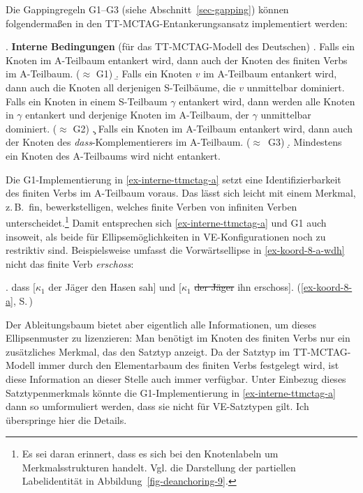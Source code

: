 Die Gappingregeln G1--G3 (siehe Abschnitt~\ref{sec-gapping}) können folgenderma\ss en in den TT-MC\-TAG-Entankerungsansatz implementiert werden: 

\ex. {\bf Interne Bedingungen} (für das TT-MCTAG-Modell des Deutschen) \label{ex-interne-ttmctag}
\a. Falls ein Knoten im A-Teilbaum entankert wird, dann auch der Knoten des finiten Verbs im A-Teilbaum. ($\approx$ G1)\label{ex-interne-ttmctag-a}
\b. Falls ein Knoten $v$ im A-Teilbaum entankert wird, dann auch die Knoten all derjenigen S-Teilbäume, die $v$ unmittelbar dominiert. Falls ein Knoten in einem S-Teilbaum $\gamma$ entankert wird, dann werden alle Knoten in $\gamma$ entankert und derjenige Knoten im A-Teilbaum, der $\gamma$ unmittelbar dominiert. ($\approx$ G2)\label{ex-interne-ttmctag-b}
\c. Falls ein Knoten im A-Teilbaum entankert wird, dann auch der Knoten des \emph{dass}-Komplementierers im A-Teilbaum. ($\approx$~G3)\label{ex-interne-ttmctag-c}
\d. Mindestens ein Knoten des A-Teilbaums wird nicht entankert.\label{ex-interne-ttmctag-d} %

Die G1-Implementierung in \ref{ex-interne-ttmctag-a} setzt eine Identifizierbarkeit des finiten Verbs im A-Teil\-baum voraus. Das lässt sich leicht mit einem Merkmal, z.\,B.\ {\sc fin}, bewerkstelligen, welches finite Verben von infiniten Verben unterscheidet.\footnote{Es sei daran erinnert, dass es sich bei den Knotenlabeln um Merkmalsstrukturen handelt. Vgl. die Darstellung der partiellen Labelidentität in Abbildung~\ref{fig-deanchoring-9}.} Damit entsprechen sich \ref{ex-interne-ttmctag-a} und G1 auch insoweit, als beide für Ellipsemöglichkeiten in VE-Konfigurationen noch zu restriktiv sind. Beispielsweise umfasst die Vorwärtsellipse in \ref{ex-koord-8-a-wdh} nicht das finite Verb {\it erschoss}: 

\ex. \label{ex-koord-8-a-wdh}dass [$\kappa_1$ der Jäger den Hasen sah] und [$\kappa_1$ \sout{der Jäger} ihn erschoss]. \hfill (\ref{ex-koord-8-a}, S.\,\pageref{ex-koord-8-a})     

Der Ableitungsbaum bietet aber eigentlich alle Informationen, um dieses Ellipsenmuster zu lizenzieren: Man benötigt im Knoten des finiten Verbs nur ein zusätzliches Merkmal, das den Satztyp anzeigt. Da der Satztyp im TT-MCTAG-Modell immer durch den Elementarbaum des finiten Verbs festgelegt wird, ist diese Information an dieser Stelle auch immer verfügbar. Unter Einbezug dieses Satztypenmerkmals könnte die G1-Implementierung in \ref{ex-interne-ttmctag-a} dann so umformuliert werden, dass sie nicht für VE-Satztypen gilt. Ich überspringe hier die Details. 

